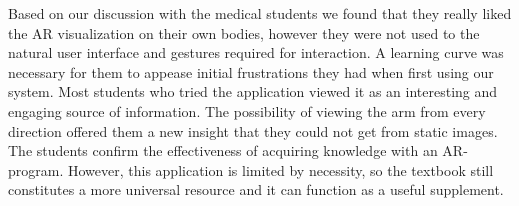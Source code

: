 Based on our discussion with the medical students we found that they really liked the AR visualization on their own bodies, however they were not used to the natural user interface and gestures required for interaction. A learning curve was necessary for them to appease initial frustrations they had when first using our system.
Most students who tried the application viewed it as an interesting and engaging source of information. The possibility of viewing the arm from every direction offered them a new insight that they could not get from static images. The students confirm the effectiveness of acquiring knowledge with an AR-program. However, this application is limited by necessity, so the textbook still constitutes a more universal resource and it can function as a useful supplement. 

